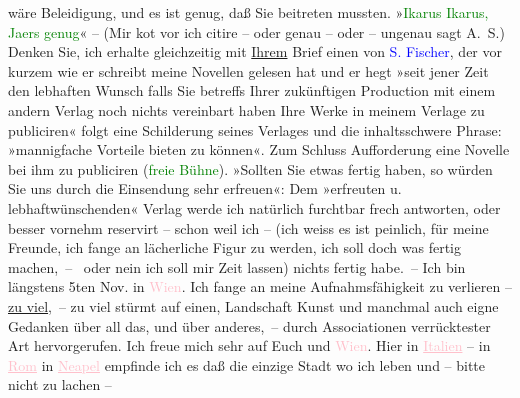                wäre Beleidigung, und es ist genug, daß Sie beitre{\pb}ten mussten. »\textcolor{green}{Ikarus Ikarus, Ja{\geminationm}ers
                  genug}{}« – (Mir ko{\geminationm}t vor ich citire \label{K_L00384_2v}\label{K_L00384_2h} – oder genau – oder – ungenau sagt
               A. S.)\pend
           \pstart
           Denken Sie, ich erhalte gleichzeitig mit \uline{Ihrem} Brief
               einen von \textcolor{blue}{S. Fischer}{}\ledrightnote{\textcolor{blue}{Samuel Fischer}}, der vor kurzem wie er
               schreibt meine Novellen gelesen hat und er hegt »seit jener Zeit den lebhaften Wunsch
                  {\pb}falls Sie betreffs Ihrer
               zukünftigen Production mit einem andern Verlag noch nichts vereinbart haben Ihre
               Werke in meinem Verlage zu publiciren« folgt eine Schilderung seines Verlages und die
               inhaltsschwere Phrase: »mannigfache Vorteile bieten zu können«. Zum Schluss
               Aufforderung eine Novelle bei ihm zu publiciren (\textcolor{green}{freie
                  Bühne}{}\ledrightnote{\textcolor{green}{Neue Deutsche Rundschau}}). »Sollten Sie {\pb}etwas
               fertig haben, so würden Sie uns durch die Einsendung sehr erfreuen«: Dem »erfreuten
               u. lebhaftwünschenden« Verlag werde ich natürlich furchtbar frech antworten, oder
               besser vornehm reservirt – schon weil ich – (ich weiss es ist peinlich, für meine
               Freunde, ich fange an lächerliche Figur zu werden, ich soll doch was fer{\pb}tig machen, –  oder nein ich soll
               mir Zeit lassen) nichts fertig habe. –\pend
           \pstart
           Ich bin längstens 5ten Nov. in \textcolor{pink}{Wien}{}\ledrightnote{\textcolor{pink}{Wien}}. Ich
               fange an meine Aufnahmsfähigkeit zu verlieren – \uline{zu
                  viel}, – zu viel stürmt auf einen, Landschaft Kunst und manchmal {\pb}auch eigne Gedanken über all das,
               und über anderes, – durch Associationen verrücktester Art hervorgerufen.\pend
           \pstart
           Ich freue mich sehr auf Euch und \textcolor{pink}{Wien}{}\ledrightnote{\textcolor{pink}{Wien}}. Hier in \textcolor{pink}{\uline{Italien}}{}\ledrightnote{\textcolor{pink}{Italien}} – in \textcolor{pink}{\uline{Rom}}{}\ledrightnote{\textcolor{pink}{Rom}} in \textcolor{pink}{\uline{Neapel}}{}\ledrightnote{\textcolor{pink}{Neapel}} empfinde ich es daß die einzige Stadt wo ich leben {\pb}und – bitte nicht zu lachen –
